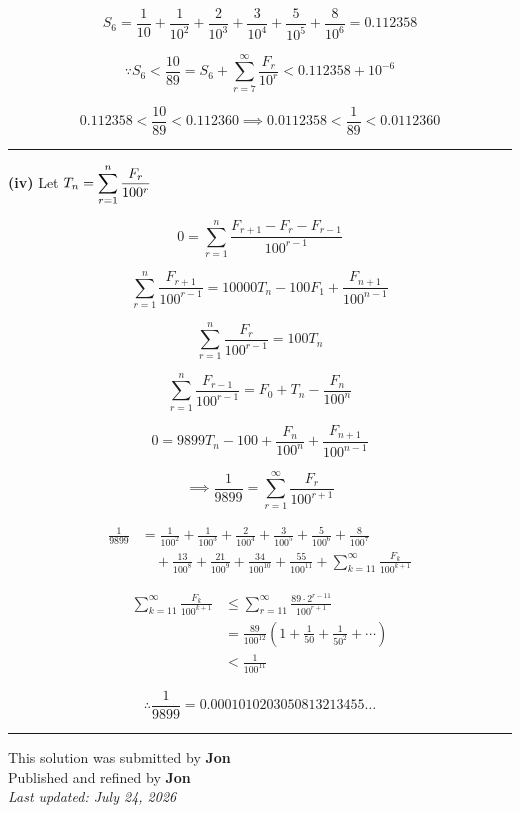 \documentclass[12pt]{article}
\begin{document}
$$S_6=\frac1{10}+\frac1{10^2}+\frac2{10^3}+\frac3{10^4}+\frac5{10^5}+\frac8{10^6}=0.112358$$

$$\because S_6<\frac{10}{89}=S_6+\sum_{r=7}^{\infty}\frac{F_r}{10^r}<0.112358+10^{-6}$$

$$0.112358<\frac{10}{89}<0.112360\implies 0.0112358<\frac1{89}<0.0112360$$

\bigskip\hrule\bigskip
\textbf{(iv)} Let $\displaystyle T_n=\sum_{r=1}^n\frac{F_r}{100^r}$

$$0=\sum_{r=1}^n\frac{F_{r+1}-F_r-F_{r-1}}{100^{r-1}}$$

$$\sum_{r=1}^n\frac{F_{r+1}}{100^{r-1}}=10000T_n-100F_1+\frac{F_{n+1}}{100^{n-1}}$$

$$\sum_{r=1}^n\frac{F_r}{100^{r-1}}=100T_n$$

$$\sum_{r=1}^n\frac{F_{r-1}}{100^{r-1}}
=F_0+T_n-\frac{F_n}{100^n}$$

$$0=9899T_n-100+\frac{F_n}{100^n}+\frac{F_{n+1}}{100^{n-1}}$$

$$\implies \frac1{9899}=\sum_{r=1}^{\infty}\frac{F_r}{100^{r+1}}$$

\begin{align*}
\frac1{9899}
&=\frac1{100^2}+\frac1{100^3}+\frac2{100^4}+\frac3{100^5}
+\frac5{100^6}+\frac8{100^7}\\
&\quad+\frac{13}{100^8}+\frac{21}{100^9}
+\frac{34}{100^{10}}+\frac{55}{100^{11}}+\sum_{k=11}^{\infty}\frac{F_k}{100^{k+1}}
\end{align*}

\begin{align*}
\sum_{k=11}^{\infty}\frac{F_k}{100^{k+1}}
&\leq \sum_{r=11}^{\infty}\frac{89\cdot2^{r-11}}{100^{r+1}}\\
&=\frac{89}{100^{12}}\left(1+\frac1{50}+\frac1{50^2}+\cdots\right)\\
&<\frac1{100^{11}}
\end{align*}

$$\therefore \frac1{9899}=0.0001010203050813213455\ldots$$
\bigskip
\hrule
\begin{center}
    This solution was submitted by \textbf{Jon}\\[4pt]
    Published and refined by \textbf{Jon}\\[8pt]
    \textit{Last updated: July 24, 2026}
\end{center}
\end{document}
